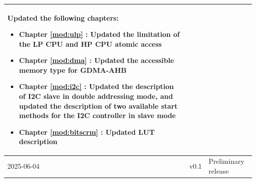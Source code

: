 \begin{longtable}[l]{ | m{2cm} | m{1.5cm} | m{12cm} | }
    Updated the following chapters:
    \begin{itemize}
        \item Chapter \ref{mod:ulp} \textit{\nameref{mod:ulp}}: Updated the limitation of the LP CPU and HP CPU atomic access %
        \item Chapter \ref{mod:dma} \textit{\nameref{mod:dma}}: Updated the accessible memory type for GDMA-AHB %
        \item Chapter \ref{mod:i2c} \textit{\nameref{mod:i2c}}: Updated the description of I2C slave in double addressing mode, and updated the description of two available start methods for the I2C controller in slave mode %
        \item Chapter \ref{mod:bitscrm} \textit{\nameref{mod:bitscrm}}: Updated LUT description %
    \end{itemize}
    \\\hline
    2025-06-04 & v0.1 & Preliminary release \\\hline

\end{longtable}
